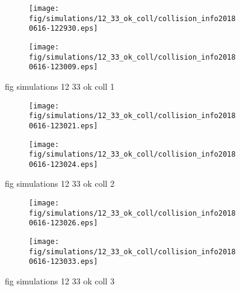 \begin{figure}[H]
	\centering
	\begin{subfigure}[b]{0.8\textwidth}
		\texttt{[image: fig/simulations/12\_33\_ok\_coll/collision\_info20180616-122930.eps]}
		\caption{}
		\label{fig:simulations:12_33_ok_coll:collision_info20180616-122930}
	\end{subfigure}

	\begin{subfigure}[b]{0.8\textwidth}
		\texttt{[image: fig/simulations/12\_33\_ok\_coll/collision\_info20180616-123009.eps]}
		\caption{}
		\label{fig:simulations:12_33_ok_coll:collision_info20180616-123009}
	\end{subfigure}
	\caption{fig simulations 12 33 ok coll 1}
	\label{fig:simulations:12_33_ok_coll:1}
\end{figure}

\begin{figure}[H]
	\centering
	\begin{subfigure}[b]{0.8\textwidth}
		\texttt{[image: fig/simulations/12\_33\_ok\_coll/collision\_info20180616-123021.eps]}
		\caption{}
		\label{fig:simulations:12_33_ok_coll:collision_info20180616-123021}
	\end{subfigure}

	\begin{subfigure}[b]{0.8\textwidth}
		\texttt{[image: fig/simulations/12\_33\_ok\_coll/collision\_info20180616-123024.eps]}
		\caption{}
		\label{fig:simulations:12_33_ok_coll:collision_info20180616-123024}
	\end{subfigure}
	\caption{fig simulations 12 33 ok coll 2}
	\label{fig:simulations:12_33_ok_coll:2}
\end{figure}

\begin{figure}[H]
	\centering
	\begin{subfigure}[b]{0.8\textwidth}
		\texttt{[image: fig/simulations/12\_33\_ok\_coll/collision\_info20180616-123026.eps]}
		\caption{}
		\label{fig:simulations:12_33_ok_coll:collision_info20180616-123026}
	\end{subfigure}

	\begin{subfigure}[b]{0.8\textwidth}
		\texttt{[image: fig/simulations/12\_33\_ok\_coll/collision\_info20180616-123033.eps]}
		\caption{}
		\label{fig:simulations:12_33_ok_coll:collision_info20180616-123033}
	\end{subfigure}
	\caption{fig simulations 12 33 ok coll 3}
	\label{fig:simulations:12_33_ok_coll:3}
\end{figure}

